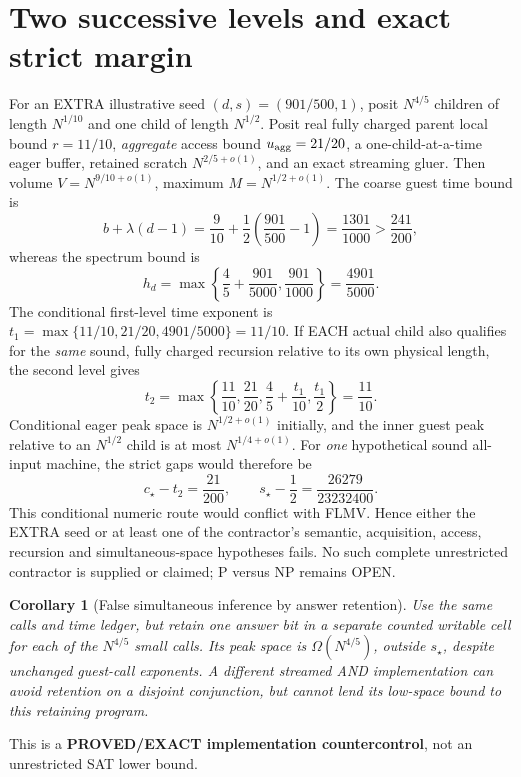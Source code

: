 \documentclass[11pt]{article}
\newtheorem{corollary}[theorem]{Corollary}
\begin{document}
\section{Two successive levels and exact strict margin}
For an EXTRA illustrative seed $(d,s)=(901/500,1)$, posit $N^{4/5}$ children of length $N^{1/10}$ and one child of length $N^{1/2}$. Posit real fully charged parent local bound $r=11/10$, \emph{aggregate} access bound $u_{\rm agg}=21/20$, a one-child-at-a-time eager buffer, retained scratch $N^{2/5+o(1)}$, and an exact streaming gluer. Then volume $V=N^{9/10+o(1)}$, maximum $M=N^{1/2+o(1)}$. The coarse guest time bound is
\[
b+\lambda(d-1)=\frac9{10}+\frac12\left(\frac{901}{500}-1\right)
=\frac{1301}{1000}>\frac{241}{200},
\]
whereas the spectrum bound is
\[
h_d=\max\left\{\frac45+\frac{901}{5000},\frac{901}{1000}\right\}
=\frac{4901}{5000}.
\]
The conditional first-level time exponent is $t_1=\max\{11/10,21/20,4901/5000\}=11/10$.
If EACH actual child also qualifies for the \emph{same} sound, fully charged recursion relative to its own physical length, the second level gives
\[
t_2=\max\left\{\frac{11}{10},\frac{21}{20},
\frac45+\frac{t_1}{10},\frac{t_1}{2}\right\}=\frac{11}{10}.
\]
Conditional eager peak space is $N^{1/2+o(1)}$ initially, and the inner guest peak relative to an $N^{1/2}$ child is at most $N^{1/4+o(1)}$. For \emph{one} hypothetical sound all-input machine, the strict gaps would therefore be
\[
c_\star-t_2=\frac{21}{200},\qquad
s_\star-\frac12=\frac{26279}{23232400}.
\]
This conditional numeric route would conflict with FLMV. Hence either the EXTRA seed or at least one of the contractor's semantic, acquisition, access, recursion and simultaneous-space hypotheses fails. No such complete unrestricted contractor is supplied or claimed; P versus NP remains OPEN.

\begin{corollary}[False simultaneous inference by answer retention]
Use the same calls and time ledger, but retain one answer bit in a separate counted writable cell for each of the $N^{4/5}$ small calls. Its peak space is $\Omega(N^{4/5})$, outside $s_\star$, despite unchanged guest-call exponents. A different streamed AND implementation can avoid retention on a disjoint conjunction, but cannot lend its low-space bound to this retaining program.
\end{corollary}
This is a \textbf{PROVED/EXACT implementation countercontrol}, not an unrestricted SAT lower bound.
\end{document}
